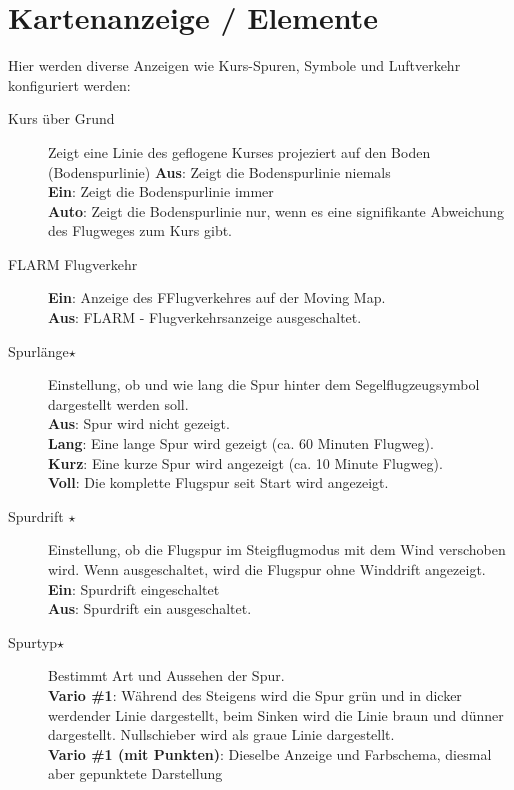 \section{Kartenanzeige / Elemente}\label{sec:map-elements}
Hier werden diverse Anzeigen wie Kurs-Spuren, Symbole und Luftverkehr konfiguriert werden:
\begin{description}
\item[Kurs über Grund] Zeigt eine Linie des geflogene Kurses projeziert auf den Boden (Bodenspurlinie)
   {\bf Aus}: Zeigt die Bodenspurlinie niemals\\
   {\bf Ein}: Zeigt die Bodenspurlinie immer\\
   {\bf Auto}: Zeigt die Bodenspurlinie nur, wenn es eine signifikante Abweichung des Flugweges zum Kurs gibt.
\item[FLARM Flugverkehr ]
   {\bf Ein}:  \label{conf:flarm-on-map} Anzeige des F\fl Flugverkehres auf der Moving Map.\\
   {\bf Aus}: FLARM - Flugverkehrsanzeige ausgeschaltet.
\item[Spurlänge$\star$] \label{conf:snailtrail} Einstellung, ob und wie lang die Spur hinter dem
Segelflugzeugsymbol dargestellt werden soll. \\
   {\bf Aus}: Spur wird nicht gezeigt. \\
   {\bf Lang}: Eine lange Spur wird gezeigt (ca. 60 Minuten Flugweg).\\
   {\bf Kurz}: Eine kurze Spur wird angezeigt (ca. 10 Minute Flugweg). \\
   {\bf Voll}: Die komplette Flugspur seit Start wird angezeigt.
\item[Spurdrift $\star$] \label{conf:traildrift} Einstellung, ob die Flugspur im Steigflugmodus
mit dem Wind verschoben wird. Wenn ausgeschaltet, wird die Flugspur ohne Winddrift angezeigt.\\
   {\bf Ein}: Spurdrift eingeschaltet\\
   {\bf Aus}: Spurdrift ein ausgeschaltet.
\item[Spurtyp$\star$] \label{conf:snailtype} Bestimmt Art und Aussehen der Spur.\\
  {\bf Vario \#1}: Während des Steigens wird die Spur grün und in dicker werdender Linie dargestellt,
  beim Sinken wird die Linie braun und dünner dargestellt. Nullschieber wird als graue Linie dargestellt.\\
  {\bf Vario \#1 (mit Punkten)}: Dieselbe Anzeige und Farbschema, diesmal aber gepunktete Darstellung

\end{description}
